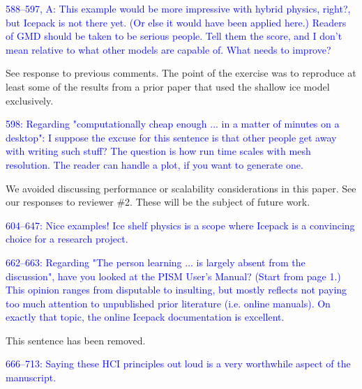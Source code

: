 \documentclass{article}
\theoremstyle{definition}
\theoremstyle{plain}
\begin{document}
\textcolor{blue}{588--597, A:  This example would be more impressive with hybrid physics, right?, but Icepack is not there yet.  (Or else it would have been applied here.)  Readers of GMD should be taken to be serious people.  Tell them the score, and I don't mean relative to what other models are capable of.  What needs to improve?}

See response to previous comments.
The point of the exercise was to reproduce at least some of the results from a prior paper that used the shallow ice model exclusively.

\textcolor{blue}{598:  Regarding "computationally cheap enough ... in a matter of minutes on a desktop":  I suppose the excuse for this sentence is that other people get away with writing such stuff?  The question is how run time scales with mesh resolution.  The reader can handle a plot, if you want to generate one.}

We avoided discussing performance or scalability considerations in this paper.
See our responses to reviewer \#2.
These will be the subject of future work.

\textcolor{blue}{604--647:  Nice examples!  Ice shelf physics is a scope where Icepack is a convincing choice for a research project.}

\textcolor{blue}{662--663:  Regarding "The person learning ... is largely absent from the discussion", have you looked at the PISM User's Manual?  (Start from page 1.)  This opinion ranges from disputable to insulting, but mostly reflects not paying too much attention to unpublished prior literature (i.e. online manuals).  On exactly that topic, the online Icepack documentation is excellent.}

This sentence has been removed.

\textcolor{blue}{666--713:  Saying these HCI principles out loud is a very worthwhile aspect of the manuscript.}
\end{document}
